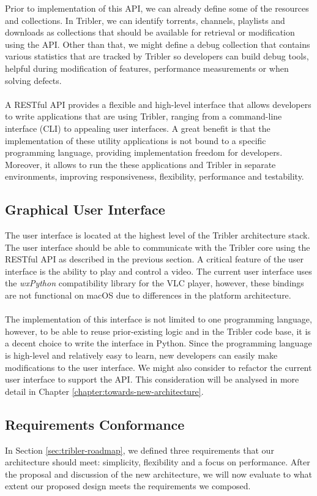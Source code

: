 Prior to implementation of this API, we can already define some of the resources and collections. In Tribler, we can identify torrents, channels, playlists and downloads as collections that should be available for retrieval or modification using the API. Other than that, we might define a debug collection that contains various statistics that are tracked by Tribler so developers can build debug tools, helpful during modification of features, performance measurements or when solving defects.\\\\
A RESTful API provides a flexible and high-level interface that allows developers to write applications that are using Tribler, ranging from a command-line interface (CLI) to appealing user interfaces. A great benefit is that the implementation of these utility applications is not bound to a specific programming language, providing implementation freedom for developers. Moreover, it allows to run the these applications and Tribler in separate environments, improving responsiveness, flexibility, performance and testability.

\subsection{Graphical User Interface}
The user interface is located at the highest level of the Tribler architecture stack. The user interface should be able to communicate with the Tribler core using the RESTful API as described in the previous section. A critical feature of the user interface is the ability to play and control a video. The current user interface uses the \emph{wxPython} compatibility library for the VLC player, however, these bindings are not functional on macOS due to differences in the platform architecture.\\\\
The implementation of this interface is not limited to one programming language, however, to be able to reuse prior-existing logic and in the Tribler code base, it is a decent choice to write the interface in Python. Since the programming language is high-level and relatively easy to learn, new developers can easily make modifications to the user interface. We might also consider to refactor the current user interface to support the API. This consideration will be analysed in more detail in Chapter \ref{chapter:towards-new-architecture}. 

\subsection{Requirements Conformance}
In Section \ref{sec:tribler-roadmap}, we defined three requirements that our architecture should meet: simplicity, flexibility and a focus on performance. After the proposal and discussion of the new architecture, we will now evaluate to what extent our proposed design meets the requirements we composed.

